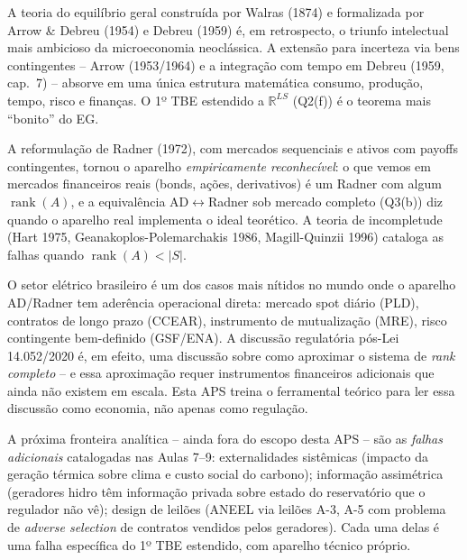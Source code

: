 \documentclass[11pt,addpoints]{exam}
\newcommand{\rank}{\operatorname{rank}}
\begin{document}
\vspace{1em}
\begin{contextbox}
\small
A teoria do equilíbrio geral construída por Walras (1874) e formalizada por Arrow \& Debreu (1954) e Debreu (1959) é, em retrospecto, o triunfo intelectual mais ambicioso da microeconomia neoclássica. A extensão para incerteza via bens contingentes -- Arrow (1953/1964) e a integração com tempo em Debreu (1959, cap.~7) -- absorve em uma única estrutura matemática consumo, produção, tempo, risco e finanças. O 1º TBE estendido a $\mathbb{R}^{LS}$ (Q2(f)) é o teorema mais ``bonito'' do EG.

A reformulação de Radner (1972), com mercados sequenciais e ativos com payoffs contingentes, tornou o aparelho \emph{empiricamente reconhecível}: o que vemos em mercados financeiros reais (bonds, ações, derivativos) é um Radner com algum $\rank(A)$, e a equivalência AD$\leftrightarrow$Radner sob mercado completo (Q3(b)) diz quando o aparelho real implementa o ideal teorético. A teoria de incompletude (Hart 1975, Geanakoplos-Polemarchakis 1986, Magill-Quinzii 1996) cataloga as falhas quando $\rank(A) < |S|$.

O setor elétrico brasileiro é um dos casos mais nítidos no mundo onde o aparelho AD/Radner tem aderência operacional direta: mercado spot diário (PLD), contratos de longo prazo (CCEAR), instrumento de mutualização (MRE), risco contingente bem-definido (GSF/ENA). A discussão regulatória pós-Lei 14.052/2020 é, em efeito, uma discussão sobre como aproximar o sistema de \emph{rank completo} -- e essa aproximação requer instrumentos financeiros adicionais que ainda não existem em escala. Esta APS treina o ferramental teórico para ler essa discussão como economia, não apenas como regulação.

A próxima fronteira analítica -- ainda fora do escopo desta APS -- são as \emph{falhas adicionais} catalogadas nas Aulas 7--9: externalidades sistêmicas (impacto da geração térmica sobre clima e custo social do carbono); informação assimétrica (geradores hidro têm informação privada sobre estado do reservatório que o regulador não vê); design de leilões (ANEEL via leilões A-3, A-5 com problema de \emph{adverse selection} de contratos vendidos pelos geradores). Cada uma delas é uma falha específica do 1º TBE estendido, com aparelho técnico próprio.
\end{contextbox}
\end{document}
